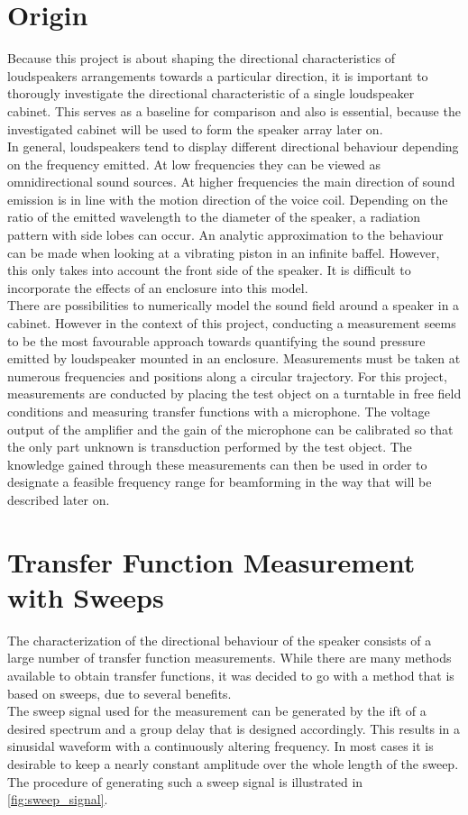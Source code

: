 \section{Origin}
Because this project is about shaping the directional characteristics of loudspeakers arrangements towards a particular direction, it is important to thorougly investigate the directional characteristic of a single loudspeaker cabinet. This serves as a baseline for comparison and also is essential, because the investigated cabinet will be used to form the speaker array later on.\\
In general, loudspeakers tend to display different directional behaviour depending on the frequency emitted. At low frequencies they can be viewed as omnidirectional sound sources. At higher frequencies the main direction of sound emission is in line with the motion direction of the voice coil. \citep[p. 910 f.]{crocker98}
Depending on the ratio of the emitted wavelength to the diameter of the speaker, a radiation pattern with side lobes can occur. An analytic approximation to the behaviour can be made  when looking at a vibrating piston in an infinite baffel. However, this only takes into account the front side of the speaker. It is difficult to incorporate the effects of an enclosure into this model.\\
There are possibilities to numerically model the sound field around a speaker in a cabinet. However in the context of this project, conducting a measurement seems to be the most favourable approach towards quantifying the sound pressure emitted by loudspeaker mounted in an enclosure. Measurements must be taken at numerous frequencies and positions along a circular trajectory.
For this project, measurements are conducted by placing the test object on a turntable in free field conditions and measuring transfer functions with a microphone. The voltage output of the amplifier and the gain of the microphone can be calibrated so that the only part unknown is transduction performed by the test object.
The knowledge gained through these measurements can then be used in order to designate a feasible frequency range for beamforming in the way that will be described later on. 

\section{Transfer Function Measurement with Sweeps}\label{sec:sweep_theorie}
The characterization of the directional behaviour of the speaker consists of a large number of transfer function measurements. While there are many methods available to obtain transfer functions, it was decided to go with a method that is based on sweeps, due to several benefits. \citep[p. 3 ff.]{mueller01}\\
The sweep signal used for the measurement can be generated by the \gls{ift} of a desired spectrum and a group delay that is designed accordingly. This results in a sinusidal waveform with a continuously altering frequency. In most cases it is desirable to keep a nearly constant amplitude over the whole length of the sweep. The procedure of generating such a sweep signal is illustrated in \autoref{fig:sweep_signal}.

